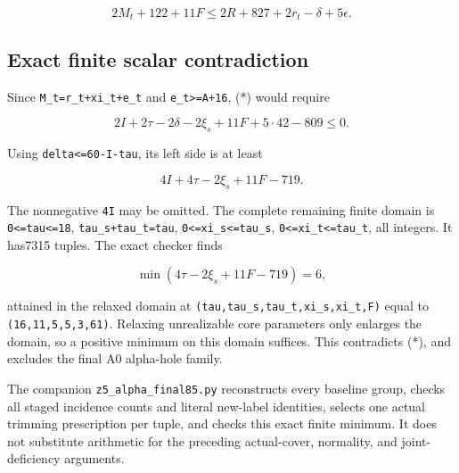 \documentclass[10pt,a4paper]{article}
\theoremstyle{definition}
\begin{document}
\[
 2M_t+\allowbreak{}122+\allowbreak{}11F\le2R+\allowbreak{}827+\allowbreak{}2r_t-\delta+\allowbreak{}5\epsilon.        \tag{*}
\]

\hypertarget{exact-finite-scalar-contradiction}{%
\subsection{Exact finite scalar
contradiction}\label{exact-finite-scalar-contradiction}}

Since \texttt{M\_\allowbreak{}\allowbreak{}t=\allowbreak{}r\_\allowbreak{}\allowbreak{}t+\allowbreak{}xi\_\allowbreak{}\allowbreak{}t+\allowbreak{}e\_\allowbreak{}\allowbreak{}t} and
\texttt{e\_\allowbreak{}\allowbreak{}t>=\allowbreak{}A+\allowbreak{}16},\allowbreak{} (*) would require

\[
 2I+\allowbreak{}2\tau-2\delta-2\xi_s+\allowbreak{}11F+\allowbreak{}5\cdot42-809\le0.
\]

Using \texttt{delta<=\allowbreak{}60-I-tau},\allowbreak{} its left side is at
least

\[
 4I+\allowbreak{}4\tau-2\xi_s+\allowbreak{}11F-719.
\]

The nonnegative \texttt{4I} may be omitted. The
complete remaining finite domain is
\texttt{0<=\allowbreak{}tau<=\allowbreak{}18},\allowbreak{}
\texttt{tau\_\allowbreak{}\allowbreak{}s+\allowbreak{}tau\_\allowbreak{}\allowbreak{}t=\allowbreak{}tau},\allowbreak{}
\texttt{0<=\allowbreak{}xi\_\allowbreak{}\allowbreak{}s<=\allowbreak{}tau\_\allowbreak{}\allowbreak{}s},\allowbreak{}
\texttt{0<=\allowbreak{}xi\_\allowbreak{}\allowbreak{}t<=\allowbreak{}tau\_\allowbreak{}\allowbreak{}t},\allowbreak{} all integers. It has7315
tuples. The exact checker finds

\[
 \min(4\tau-2\xi_s+\allowbreak{}11F-719)=\allowbreak{}6,\allowbreak{}
\]

attained in the relaxed domain at
\texttt{(tau,\allowbreak{}tau\_\allowbreak{}\allowbreak{}s,\allowbreak{}tau\_\allowbreak{}\allowbreak{}t,\allowbreak{}xi\_\allowbreak{}\allowbreak{}s,\allowbreak{}xi\_\allowbreak{}\allowbreak{}t,\allowbreak{}F)} equal to
\texttt{(16,\allowbreak{}11,\allowbreak{}5,\allowbreak{}5,\allowbreak{}3,\allowbreak{}61)}. Relaxing unrealizable core
parameters only enlarges the domain,\allowbreak{} so a positive minimum on this
domain suffices. This contradicts (*),\allowbreak{} and excludes the final A0
alpha-hole family.

The companion \texttt{z5\_\allowbreak{}\allowbreak{}alpha\_\allowbreak{}\allowbreak{}final85.py}
reconstructs every baseline group,\allowbreak{} checks all staged incidence counts
and literal new-label identities,\allowbreak{} selects one actual trimming
prescription per tuple,\allowbreak{} and checks this exact finite minimum. It does
not substitute arithmetic for the preceding actual-cover,\allowbreak{} normality,\allowbreak{} and
joint-deficiency arguments.
\end{document}

